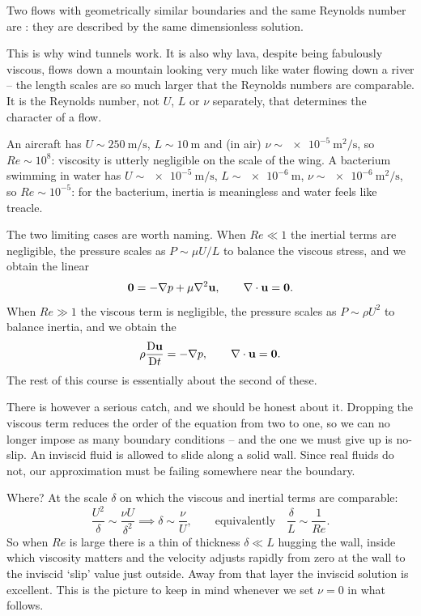 \documentclass[a4paper]{scrartcl}
\newcommand{\D}{\mathrm{D}}
\newcommand{\Dt}[1]{\frac{\D #1}{\D t}}
\newcommand{\Rey}{\mathit{Re}}
\begin{document}
\begin{definition}
	Two flows with geometrically similar boundaries and the same Reynolds number are : they are described by the same dimensionless solution.
\end{definition}

This is why wind tunnels work. It is also why lava, despite being fabulously viscous, flows down a mountain looking very much like water flowing down a river -- the length scales are so much larger that the Reynolds numbers are comparable. It is the Reynolds number, not $U$, $L$ or $\nu$ separately, that determines the character of a flow.

\begin{example}
	An aircraft has $U \sim \SI{250}{\meter\per\second}$, $L \sim \SI{10}{\meter}$ and (in air) $\nu \sim \SI{e-5}{\meter\squared\per\second}$, so $\Rey \sim 10^8$: viscosity is utterly negligible on the scale of the wing. A bacterium swimming in water has $U \sim \SI{e-5}{\meter\per\second}$, $L \sim \SI{e-6}{\meter}$, $\nu \sim \SI{e-6}{\meter\squared\per\second}$, so $\Rey \sim 10^{-5}$: for the bacterium, inertia is meaningless and water feels like treacle.
\end{example}

The two limiting cases are worth naming. When $\Rey \ll 1$ the inertial terms are negligible, the pressure scales as $P \sim \mu U/L$ to balance the viscous stress, and we obtain the linear 
$$
\mathbf{0} = -\nabla p + \mu \nabla^2 \mathbf{u}, \qquad \nabla \cdot \mathbf{u} = \mathbf{0}.
$$
When $\Rey \gg 1$ the viscous term is negligible, the pressure scales as $P \sim \rho U^2$ to balance inertia, and we obtain the 
$$
\rho \Dt{\vv u} = -\nabla p, \qquad \nabla \cdot \vv u = \vv 0.
$$
The rest of this course is essentially about the second of these.

There is however a serious catch, and we should be honest about it. Dropping the viscous term reduces the order of the equation from two to one, so we can no longer impose as many boundary conditions -- and the one we must give up is no-slip. An inviscid fluid is allowed to slide along a solid wall. Since real fluids do not, our approximation must be failing somewhere near the boundary.

Where? At the scale $\delta$ on which the viscous and inertial terms are comparable:
$$
\frac{U^2}{\delta} \sim \frac{\nu U}{\delta^2} \implies \delta \sim \frac{\nu}{U}, \qquad \text{equivalently} \quad \frac{\delta}{L} \sim \frac{1}{\Rey}.
$$
So when $\Rey$ is large there is a thin  of thickness $\delta \ll L$ hugging the wall, inside which viscosity matters and the velocity adjusts rapidly from zero at the wall to the inviscid `slip' value just outside. Away from that layer the inviscid solution is excellent. This is the picture to keep in mind whenever we set $\nu = 0$ in what follows.
\end{document}
